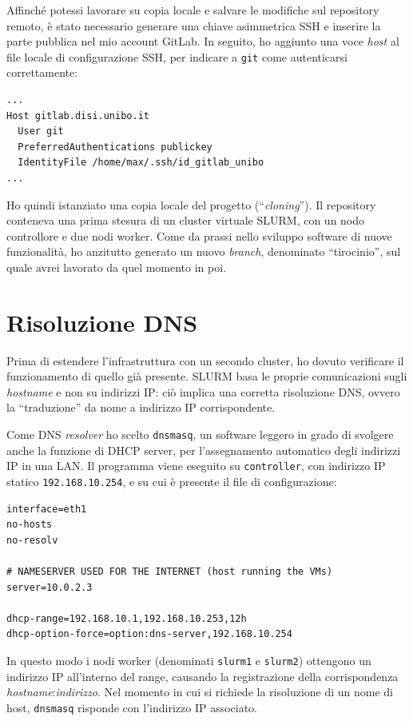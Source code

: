 \documentclass[12pt,a4paper,twoside,openright]{book}
\begin{document}
Affinché potessi lavorare su copia locale e salvare le modifiche sul repository remoto, è stato necessario generare una chiave asimmetrica \ac{SSH} e inserire la parte pubblica nel mio account GitLab. In seguito, ho aggiunto una voce \textit{host} al file locale di configurazione \ac{SSH}, per indicare a \texttt{git} come autenticarsi correttamente:
\begin{verbatim}
...
Host gitlab.disi.unibo.it
  User git
  PreferredAuthentications publickey
  IdentityFile /home/max/.ssh/id_gitlab_unibo
...
\end{verbatim}
Ho quindi istanziato una copia locale del progetto (``\textit{cloning}''). Il repository conteneva una prima stesura di un cluster virtuale \ac{SLURM}, con un nodo controllore e due nodi worker. Come da prassi nello sviluppo software di nuove funzionalità, ho anzitutto generato un nuovo \textit{branch}, denominato ``tirocinio'', sul quale avrei lavorato da quel momento in poi.

\section{Risoluzione DNS}
Prima di estendere l'infrastruttura con un secondo cluster, ho dovuto verificare il funzionamento di quello già presente. \ac{SLURM} basa le proprie comunicazioni sugli \textit{hostname} e non su indirizzi \ac{IP}: ciò implica una corretta risoluzione \ac{DNS}, ovvero la ``traduzione'' da nome a indirizzo \ac{IP} corrispondente.

Come \ac{DNS} \textit{resolver} ho scelto \texttt{dnsmasq}, un software leggero in grado di svolgere anche la funzione di \ac{DHCP} server, per l'assegnamento automatico degli indirizzi \ac{IP} in una \ac{LAN}. Il programma viene eseguito su \texttt{controller}, con indirizzo \ac{IP} statico \texttt{192.168.10.254}, e su cui è presente il file di configurazione:
\begin{verbatim}
interface=eth1
no-hosts
no-resolv

# NAMESERVER USED FOR THE INTERNET (host running the VMs)
server=10.0.2.3

dhcp-range=192.168.10.1,192.168.10.253,12h
dhcp-option-force=option:dns-server,192.168.10.254
\end{verbatim}
In questo modo i nodi worker (denominati \texttt{slurm1} e \texttt{slurm2}) ottengono un indirizzo \ac{IP} all'interno del range, causando la registrazione della corrispondenza \textit{hostname}:\textit{indirizzo}. Nel momento in cui si richiede la risoluzione di un nome di host, \texttt{dnsmasq} risponde con l'indirizzo \ac{IP} associato.
\end{document}
